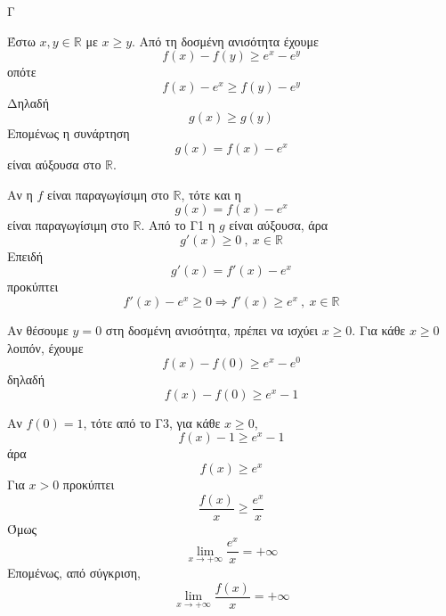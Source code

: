 \begin{thema}{Γ}
\begin{erwthma}
\item Έστω $x,y\in\mathbb{R}$ με $x\geq y$.
Από τη δοσμένη ανισότητα έχουμε
\[f(x)-f(y)\geq e^x-e^y\]
οπότε
\[f(x)-e^x\geq f(y)-e^y\]
Δηλαδή
\[g(x)\geq g(y)\]
Επομένως η συνάρτηση
\[g(x)=f(x)-e^x\]
είναι αύξουσα στο $\mathbb{R}$.

\item Αν η $f$ είναι παραγωγίσιμη στο $\mathbb{R}$, τότε και η
\[g(x)=f(x)-e^x\]
είναι παραγωγίσιμη στο $\mathbb{R}$.
Από το Γ1 η $g$ είναι αύξουσα, άρα
\[g'(x)\geq 0\ ,\ x\in\mathbb{R}\]
Επειδή
\[g'(x)=f'(x)-e^x\]
προκύπτει
\[f'(x)-e^x\geq 0\Rightarrow f'(x)\geq e^x\ ,\ x\in\mathbb{R}\]

\item Αν θέσουμε $y=0$ στη δοσμένη ανισότητα, πρέπει να ισχύει $x\geq 0$.
Για κάθε $x\geq 0$ λοιπόν, έχουμε
\[f(x)-f(0)\geq e^x-e^0\]
δηλαδή
\[f(x)-f(0)\geq e^x-1\]

\item Αν $f(0)=1$, τότε από το Γ3, για κάθε $x\geq 0$,
\[f(x)-1\geq e^x-1\]
άρα
\[f(x)\geq e^x\]
Για $x>0$ προκύπτει
\[\frac{f(x)}{x}\geq \frac{e^x}{x}\]
Όμως
\[\lim\limits_{x\to+\infty}\frac{e^x}{x}=+\infty\]
Επομένως, από σύγκριση,
\[\lim\limits_{x\to+\infty}\frac{f(x)}{x}=+\infty\]
\end{erwthma}
\end{thema}

